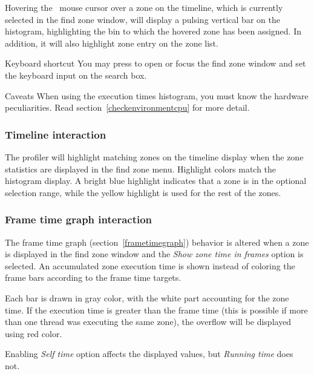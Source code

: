 \documentclass[hidelinks,titlepage,a4paper]{article}
\begin{document}
Hovering the \faMousePointer{}~mouse cursor over a zone on the timeline, which is currently selected in the find zone window, will display a pulsing vertical bar on the histogram, highlighting the bin to which the hovered zone has been assigned. In addition, it will also highlight zone entry on the zone list.

\begin{bclogo}[
noborder=true,
couleur=black!5,
logo=\bclampe
]{Keyboard shortcut}
You may press  to open or focus the find zone window and set the keyboard input on the search box.
\end{bclogo}

\begin{bclogo}[
noborder=true,
couleur=black!5,
logo=\bcattention
]{Caveats}
When using the execution times histogram, you must know the hardware peculiarities. Read section~\ref{checkenvironmentcpu} for more detail.
\end{bclogo}

\subsubsection{Timeline interaction}

The profiler will highlight matching zones on the timeline display when the zone statistics are displayed in the find zone menu. Highlight colors match the histogram display. A bright blue highlight indicates that a zone is in the optional selection range, while the yellow highlight is used for the rest of the zones.

\subsubsection{Frame time graph interaction}
\label{frametimefindzone}

The frame time graph (section~\ref{frametimegraph}) behavior is altered when a zone is displayed in the find zone window and the \emph{Show zone time in frames} option is selected. An accumulated zone execution time is shown instead of coloring the frame bars according to the frame time targets.

Each bar is drawn in gray color, with the white part accounting for the zone time. If the execution time is greater than the frame time (this is possible if more than one thread was executing the same zone), the overflow will be displayed using red color.

Enabling \emph{Self time} option affects the displayed values, but \emph{Running time} does not.
\end{document}
